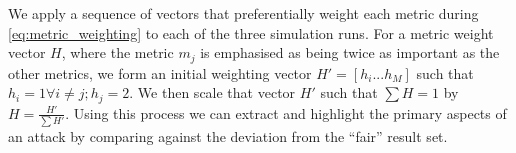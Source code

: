 \documentclass[conference]{IEEEtran}
\begin{document}
We apply a sequence of vectors that preferentially weight each metric during \eqref{eq:metric_weighting} to each of the three simulation runs.
For a metric weight vector $H$, where the metric $m_j$ is emphasised as being twice as important as the other metrics, we form an initial weighting vector $H'=[h_i...h_M]$ such that $h_i = 1 \forall i \ne j; h_j=2$. We then scale that vector $H'$ such that $\sum H = 1$ by $H= \frac{H'}{\sum H'}$.
Using this process we can extract and highlight the primary aspects of an attack by comparing against the deviation from the ``fair'' result set. 

\begin{figure}[h]
  \centering
  \newline

\end{figure}
\end{document}
